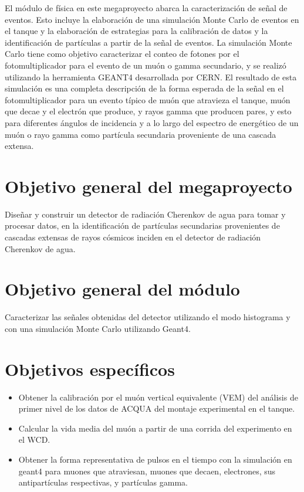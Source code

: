\documentclass{book}
\begin{document}
El m\'odulo de f\'isica en este megaproyecto abarca la caracterizaci\'on de se\~nal de eventos. Esto incluye la elaboraci\'on de una simulaci\'on Monte Carlo de eventos en el tanque y la elaboraci\'on de estrategias para la calibraci\'on de datos y la identificaci\'on de part\'iculas a partir de la se\~nal de eventos. La simulaci\'on Monte Carlo tiene como objetivo caracterizar el conteo de fotones por el fotomultiplicador para el evento de un mu\'on o gamma secundario, y se realiz\'o utilizando la herramienta GEANT4 desarrollada por CERN. El resultado de esta simulaci\'on es una completa descripci\'on de la forma esperada de la se\~nal en el fotomultiplicador para un evento t\'ipico de mu\'on que atravieza el tanque, mu\'on que decae y el electr\'on que produce, y rayos gamma que producen pares, y esto para diferentes \'angulos de incidencia y a lo largo del espectro de energ\'etico de un mu\'on o rayo gamma como part\'icula secundaria proveniente de una cascada extensa.


\section{Objetivo general del megaproyecto}
Dise\~nar y construir un detector de radiaci\'on Cherenkov de agua para tomar y procesar datos, en la identificaci\'on de part\'iculas secundarias provenientes de cascadas extensas de rayos c\'osmicos inciden en el detector de radiaci\'on Cherenkov de agua.
\section{Objetivo general del m\'odulo}
Caracterizar las se\~nales obtenidas del detector utilizando el modo histograma y con una simulaci\'on Monte Carlo utilizando Geant4.
\section{Objetivos espec\'ificos}
\begin{itemize}
 \item Obtener la calibraci\'on por el mu\'on vertical equivalente (VEM) del an\'alisis de primer nivel de los datos de ACQUA del montaje experimental en el tanque.
 \item Calcular la vida media del mu\'on a partir de una corrida del experimento en el WCD.
 \item Obtener la forma representativa de pulsos en el tiempo con la simulaci\'on en geant4 para muones que atraviesan, muones que decaen, electrones, sus antipart\'iculas respectivas, y part\'iculas gamma.
\end{itemize}
\end{document}
